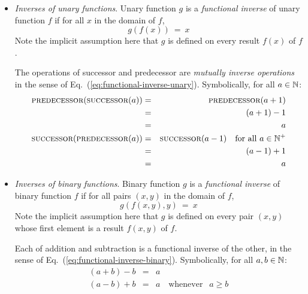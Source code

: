 \begin{itemize}
\item
{\em Inverses of unary functions}.
Unary function $g$ is a {\it functional inverse} of unary function $f$ if for all $x$ in the domain of $f$,
\begin{equation}
\label{eq:functional-inverse-unary}
g(f(x)) \ = \ x
\end{equation}
Note the implicit assumption here that $g$ is defined on every result $f(x)$ of $f$.

\smallskip


The operations of successor and predecessor are {\em mutually inverse operations} in the sense of Eq.~(\ref{eq:functional-inverse-unary}).  Symbolically, for all $a \in \mathbb{N}$:
\begin{eqnarray*}
\mbox{\sc predecessor}(\mbox{\sc successor}(a)) & = & \mbox{\sc predecessor}(a+1) \\
                                                           & = & (a+1)-1 \\
                                                           & = & a \\
\mbox{\sc successor}(\mbox{\sc predecessor}(a)) & = & \mbox{\sc successor}(a-1) \ \ \mbox{ for all } a \in \mathbb{N}^+ \\
                                                           & = & (a-1)+1 \\
                                                           & = & a \\
\end{eqnarray*}

\item
{\em Inverses of binary functions}.
Binary function $g$ is a {\it functional inverse} of binary function $f$ if for all pairs $(x, y)$ in the domain of $f$,
\begin{equation}
\label{eq:functional-inverse-binary}
g(f(x,y),y) \ = \ x
\end{equation}
Note the implicit assumption here that $g$ is defined on every pair $(x,y)$ whose first element is a result $f(x,y)$ of $f$.

\smallskip

Each of addition and subtraction is a functional inverse of the other, in the sense of Eq.~(\ref{eq:functional-inverse-binary}).  Symbolically, for all $a, b \in \mathbb{N}$:
\begin{eqnarray*}
(a+b) -b & =& a \\
(a-b) +b & =& a \ \ \
\mbox{ whenever } \ \ a \geq b
\end{eqnarray*}
\end{itemize}

